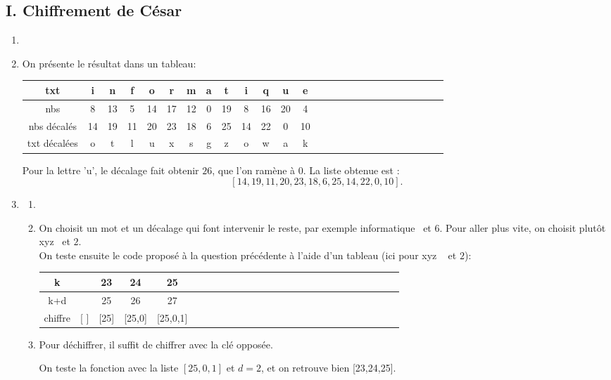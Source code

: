 \subsection*{I. Chiffrement de César}
\begin{enumerate}
\item 


\item On présente le résultat dans un tableau:
\begin{center}
\begin{tabular}{|c|c|c|c|c|c|c|c|c|c|c|c|c|c|c|c|c|c|c|c|c|c|c|c|c|c|}
\hline
txt              & i  & n  & f  & o  & r  & m  & a & t  & i  & q  & u  & e \\ \hline
nbs              & 8  & 13 & 5  & 14 & 17 & 12 & 0 & 19 & 8  & 16 & 20 & 4 \\ \hline
nbs décalés      & 14 & 19 & 11 & 20 & 23 & 18 & 6 & 25 & 14 & 22 & 0  & 10 \\ \hline
txt     décalées & o  & t  & l  & u  & x  & s  & g & z  & o  & w  & a  & k \\ \hline
\end{tabular}
\end{center}
Pour la lettre 'u', le décalage fait obtenir $26$, que l'on ramène à $0$.\newline
La liste obtenue est :
\[
 [14,19,11,20,23,18,6,25,14,22,0,10]. 
\]


\item
\begin{enumerate}
\item 

\item On choisit un mot et un décalage qui font intervenir le reste, par exemple \og informatique\fg~ et $6$. Pour aller plus vite, on choisit plutôt \og xyz\fg~ et $2$.\\
On teste ensuite le code proposé à la question précédente à l'aide d'un tableau (ici pour \og xyz \fg~ et $2$):
\begin{center}
\begin{tabular}{|c|c|c|c|c|c|c|c|c|c|c|c|c|c|c|c|c|c|c|c|c|c|c|c|c|c|} \hline
k       &     & 23   & 24     & 25       \\ \hline
k+d     &     & 25   & 26     & 27       \\ \hline
chiffre & [ ] & [25] & [25,0] & [25,0,1] \\ \hline
\end{tabular}
\end{center}

\item Pour déchiffrer, il suffit de chiffrer avec la clé opposée.

On teste la fonction avec la liste $[25,0,1]$ et $d=2$, et on retrouve bien [23,24,25].
\end{enumerate}

\end{enumerate}

